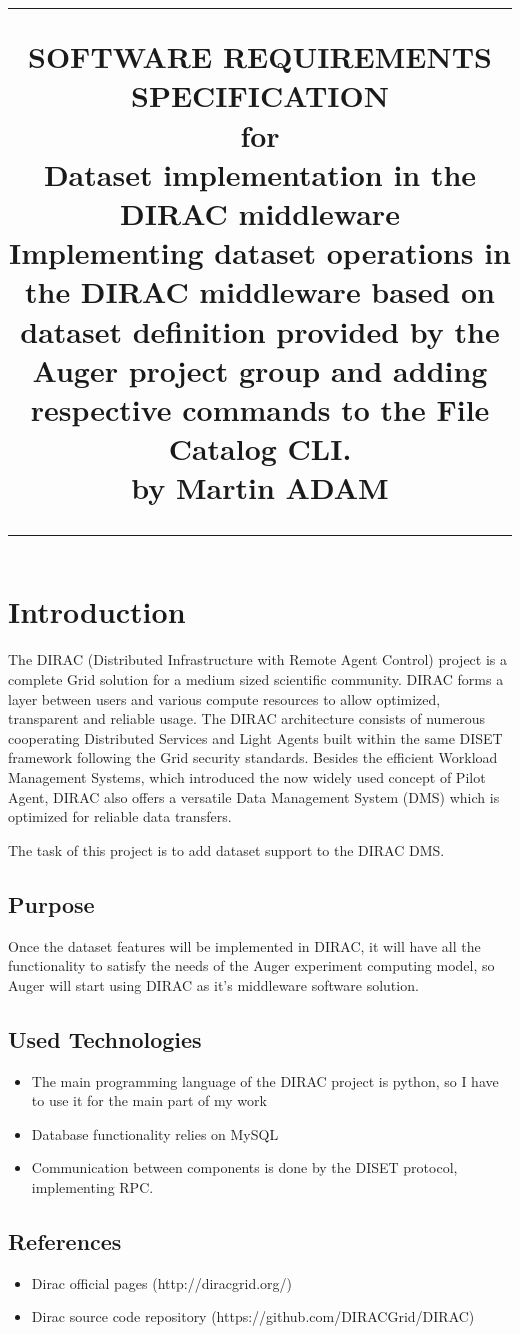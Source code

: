 \documentclass{scrreprt}
\title{%
\flushright
\rule{16cm}{5pt}\vskip1cm
\Huge{SOFTWARE REQUIREMENTS\\ SPECIFICATION}\\
\vspace{2cm}
for\\
\vspace{1cm}
Dataset implementation in the DIRAC middleware\\
\vspace{1cm}
\vspace{2cm}
\LARGE{Implementing dataset operations in the DIRAC middleware based on dataset definition provided by the Auger project group and adding respective commands to the File Catalog CLI.\\}
\vspace{2cm}
by Martin ADAM\\
\vfill
\rule{16cm}{5pt}
}
\date{}
\begin{document}
\maketitle
\tableofcontents
\chapter{Introduction}
The DIRAC (Distributed Infrastructure with Remote Agent Control) project is a complete Grid solution for a medium sized scientific community. DIRAC forms a layer between users and various compute resources to allow optimized, transparent and reliable usage. The DIRAC architecture consists of numerous cooperating Distributed Services and Light Agents built within the same DISET framework following the Grid security standards. Besides the efficient Workload Management Systems, which introduced the now widely used concept of Pilot Agent, DIRAC also offers a versatile Data Management System (DMS) which is optimized for reliable data transfers. 

The task of this project is to add dataset support to the DIRAC DMS.


\section{Purpose}
Once the dataset features will be implemented in DIRAC, it will have all the functionality to satisfy the needs of the Auger experiment computing model, so Auger will start using DIRAC as it's middleware software solution.


\section{Used Technologies}

\begin{itemize}
\item The main programming language of the DIRAC project is python, so I have to use it for the main part of my work
\item Database functionality relies on MySQL
\item Communication between components is done by the DISET protocol, implementing RPC.
\end{itemize}


\section{References}
\begin{itemize}
\item Dirac official pages (http://diracgrid.org/)
\item Dirac source code repository (https://github.com/DIRACGrid/DIRAC)
\end{itemize}
\end{document}

